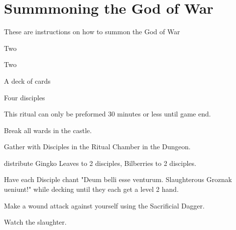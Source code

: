 \documentclass[green]{guildcamp2}
\begin{document}
\name{\gGoWrit{}}

\section{Summmoning the God of War}
These are instructions on how to summon the God of War

\begin{enum}[Requirements]
	\item \iHolyBook{}
	\item Two \iGingko{}
	\item Two \iBilberries{}
	\item \iDagger{}
	\item A deck of cards
	\item Four disciples
	\item This ritual can only be preformed 30 minutes or less until game end.
\end{enum}

\begin{enum}[Directions]
	\item Break all wards in the castle.
	\item Gather with Disciples in the Ritual Chamber in the Dungeon.
	\item distribute Gingko Leaves to 2 disciples, Bilberries to 2 disciples.
	\item Have each Disciple chant "Deum belli esse venturum. Slaughterous Groznak ueniunt!" while decking until they each get a level 2 hand.
	\item Make a wound attack against yourself using the Sacrificial Dagger.
	\item Watch the slaughter.
\end{enum}
	
\end{document}

